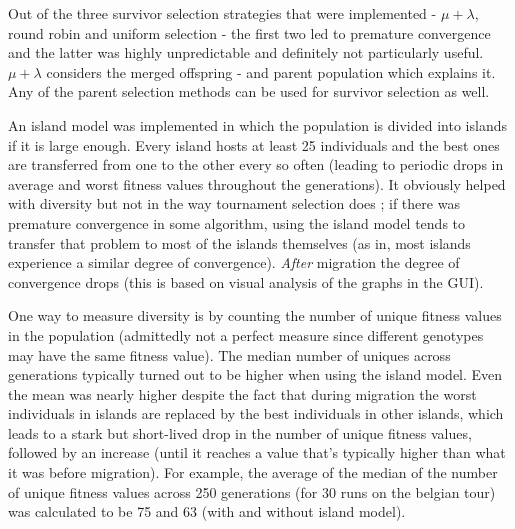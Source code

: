 
Out of the three survivor selection strategies that were implemented - $\mu+\lambda$, round robin and uniform selection - the first two led to premature convergence and the latter was highly unpredictable and definitely not particularly useful. $\mu+\lambda$ considers the merged offspring - and parent population which explains it. Any of the parent selection methods can be used for survivor selection as well.


An island model was implemented in which the population is divided into islands if it is large enough. Every island hosts at least 25 individuals and the best ones are transferred from one to the other every so often (leading to periodic drops in average and worst fitness values throughout the generations). It obviously helped with diversity but not in the way tournament selection does ; if there was premature convergence in some algorithm, using the island model tends to transfer that problem to most of the islands themselves (as in, most islands experience a similar degree of convergence). \textit{After} migration the degree of convergence drops (this is based on visual analysis of the graphs in the GUI). \\

\par\noindent One way to measure diversity is by counting the number of unique fitness values in the population (admittedly not a perfect measure since different genotypes may have the same fitness value). The median number of uniques across generations typically turned out to be higher when using the island model. Even the mean was nearly higher despite the fact that during migration the worst individuals in islands are replaced by the best individuals in other islands, which leads to a stark but short-lived drop in the number of unique fitness values, followed by an increase (until it reaches a value that's typically higher than what it was before migration). For example, the average of the median of the number of unique fitness values across 250 generations (for 30 runs on the belgian tour) was calculated to be 75 and 63 (with and without island model).


